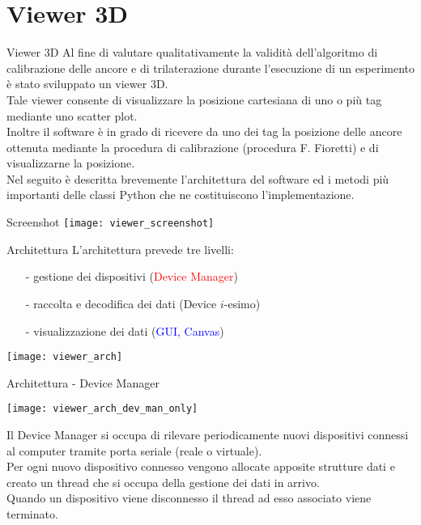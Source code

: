 \section{Viewer 3D}

\begin{frame}{Viewer 3D}
  Al fine di valutare \alert{qualitativamente} la validità dell'algoritmo di calibrazione delle ancore e di trilaterazione
  durante l'esecuzione di un esperimento è stato sviluppato un viewer 3D.\\
  Tale viewer consente di visualizzare la posizione cartesiana di uno o più tag
  mediante uno scatter plot.\\
  Inoltre il software è in grado di ricevere da uno dei tag la posizione delle ancore ottenuta
  mediante la procedura di calibrazione (procedura F. Fioretti) e di visualizzarne la posizione.\\
  Nel seguito è descritta brevemente l'architettura del software ed i metodi più importanti delle classi Python che ne
  costituiscono l'implementazione.
\end{frame}

\begin{frame}{Screenshot}
  \texttt{[image: viewer\_screenshot]}
\end{frame}

\begin{frame}{Architettura}
  L'architettura prevede tre livelli:
  \begin{itemize}
  \item[-] gestione dei dispositivi (\textcolor{red}{Device Manager})
  \item[-] raccolta e decodifica dei dati (\textcolor{dgreen}{Device $i$-esimo})
  \item[-] visualizzazione dei dati (\textcolor{blue}{GUI, Canvas})
  \end{itemize}
  \texttt{[image: viewer\_arch]}
\end{frame}

\begin{frame}[shrink=10]{Architettura - Device Manager}
  \begin{center}
    \texttt{[image: viewer\_arch\_dev\_man\_only]}
  \end{center}
  Il Device Manager si occupa di rilevare periodicamente nuovi dispositivi connessi al computer tramite porta seriale
  (reale o virtuale).\\
  Per ogni nuovo dispositivo connesso vengono allocate apposite strutture dati e creato un thread che si occupa della gestione
  dei dati in arrivo.\\
  Quando un dispositivo viene disconnesso il thread ad esso associato viene terminato.
\end{frame}

